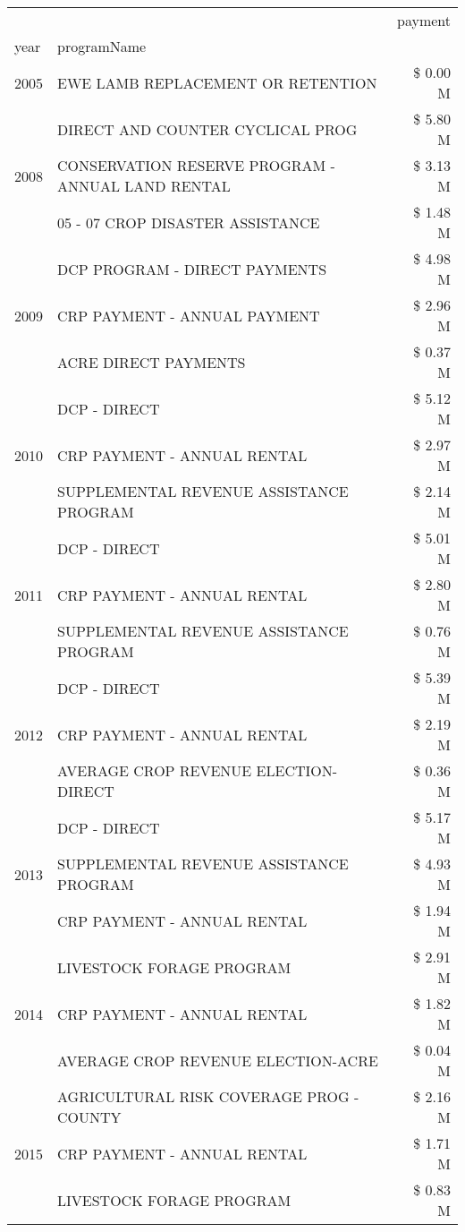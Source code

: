 \begin{tabular}{llr}
\toprule
 &  & payment \\
year & programName &  \\
\midrule
2005 & EWE LAMB REPLACEMENT OR RETENTION & \$ 0.00 M \\
\cline{1-3}
\multirow[t]{3}{*}{2008} & DIRECT AND COUNTER CYCLICAL PROG & \$ 5.80 M \\
 & CONSERVATION RESERVE PROGRAM - ANNUAL LAND RENTAL & \$ 3.13 M \\
 & 05 - 07 CROP DISASTER ASSISTANCE & \$ 1.48 M \\
\cline{1-3}
\multirow[t]{3}{*}{2009} & DCP PROGRAM - DIRECT PAYMENTS & \$ 4.98 M \\
 & CRP PAYMENT - ANNUAL PAYMENT & \$ 2.96 M \\
 & ACRE DIRECT PAYMENTS & \$ 0.37 M \\
\cline{1-3}
\multirow[t]{3}{*}{2010} & DCP - DIRECT & \$ 5.12 M \\
 & CRP PAYMENT - ANNUAL RENTAL & \$ 2.97 M \\
 & SUPPLEMENTAL REVENUE ASSISTANCE PROGRAM & \$ 2.14 M \\
\cline{1-3}
\multirow[t]{3}{*}{2011} & DCP - DIRECT & \$ 5.01 M \\
 & CRP PAYMENT - ANNUAL RENTAL & \$ 2.80 M \\
 & SUPPLEMENTAL REVENUE ASSISTANCE PROGRAM & \$ 0.76 M \\
\cline{1-3}
\multirow[t]{3}{*}{2012} & DCP - DIRECT & \$ 5.39 M \\
 & CRP PAYMENT - ANNUAL RENTAL & \$ 2.19 M \\
 & AVERAGE CROP REVENUE ELECTION-DIRECT & \$ 0.36 M \\
\cline{1-3}
\multirow[t]{3}{*}{2013} & DCP - DIRECT & \$ 5.17 M \\
 & SUPPLEMENTAL REVENUE ASSISTANCE PROGRAM & \$ 4.93 M \\
 & CRP PAYMENT - ANNUAL RENTAL & \$ 1.94 M \\
\cline{1-3}
\multirow[t]{3}{*}{2014} & LIVESTOCK FORAGE PROGRAM & \$ 2.91 M \\
 & CRP PAYMENT - ANNUAL RENTAL & \$ 1.82 M \\
 & AVERAGE CROP REVENUE ELECTION-ACRE & \$ 0.04 M \\
\cline{1-3}
\multirow[t]{3}{*}{2015} & AGRICULTURAL RISK COVERAGE PROG - COUNTY & \$ 2.16 M \\
 & CRP PAYMENT - ANNUAL RENTAL & \$ 1.71 M \\
 & LIVESTOCK FORAGE PROGRAM & \$ 0.83 M \\

\end{tabular}
